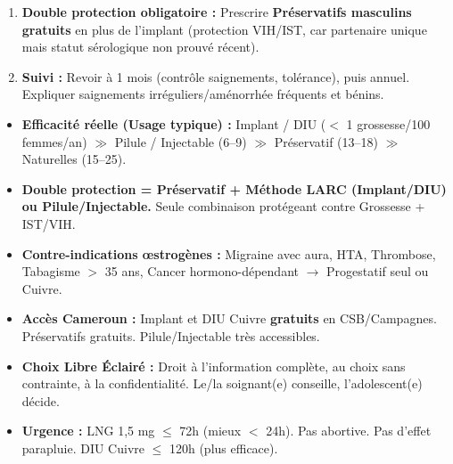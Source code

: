 \documentclass[11pt]{article}
\begin{document}
\begin{exoresolu}
\begin{enumerate}
    \begin{itemize}
        \item Progestatif seul (LNG/ETG) : \textbf{Autorisé} migraine avec aura, tabagisme, règles irrégulières.
        \item Efficacité maximale (IP 0,05\%), durée 3--5 ans = couvre projet.
        \item Observance nulle (pose unique).
        \item Gratuit au CSB (campagne PF).
        \item Réversible immédiatement à l'arrêt.
    \end{itemize}
    \item \textbf{Double protection obligatoire :} Prescrire \textbf{Préservatifs masculins gratuits} en plus de l'implant (protection VIH/IST, car partenaire unique mais statut sérologique non prouvé récent).
    \item \textbf{Suivi :} Revoir à 1 mois (contrôle saignements, tolérance), puis annuel. Expliquer saignements irréguliers/aménorrhée fréquents et bénins.
\end{enumerate}
\end{exoresolu}

\begin{aretenir}
\begin{itemize}
    \item \textbf{Efficacité réelle (Usage typique) :} Implant / DIU ($<$ 1 grossesse/100 femmes/an) $\gg$ Pilule / Injectable (6--9) $\gg$ Préservatif (13--18) $\gg$ Naturelles (15--25).
    \item \textbf{Double protection = Préservatif + Méthode LARC (Implant/DIU) ou Pilule/Injectable.} Seule combinaison protégeant contre Grossesse + IST/VIH.
    \item \textbf{Contre-indications œstrogènes :} Migraine avec aura, HTA, Thrombose, Tabagisme $>$ 35 ans, Cancer hormono-dépendant $\rightarrow$ Progestatif seul ou Cuivre.
    \item \textbf{Accès Cameroun :} Implant et DIU Cuivre \textbf{gratuits} en CSB/Campagnes. Préservatifs gratuits. Pilule/Injectable très accessibles.
    \item \textbf{Choix Libre Éclairé :} Droit à l'information complète, au choix sans contrainte, à la confidentialité. Le/la soignant(e) conseille, l'adolescent(e) décide.
    \item \textbf{Urgence :} LNG 1,5 mg $\le$ 72h (mieux $<$ 24h). Pas abortive. Pas d'effet parapluie. DIU Cuivre $\le$ 120h (plus efficace).
\end{itemize}
\end{aretenir}
\end{document}
